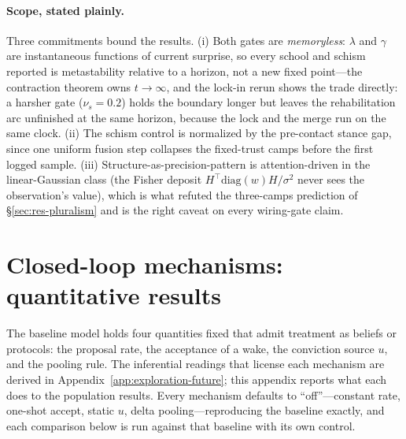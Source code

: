 \documentclass[runningheads]{llncs}
\begin{document}
\paragraph{Scope, stated plainly.}
Three commitments bound the results. (i) Both gates are \emph{memoryless}: $\lambda$ and
$\gamma$ are instantaneous functions of current surprise, so every school and schism reported is
metastability relative to a horizon, not a new fixed point---the contraction theorem owns
$t\to\infty$, and the lock-in rerun shows the trade directly: a harsher gate ($\nu_s{=}0.2$)
holds the boundary longer but leaves the rehabilitation arc unfinished at the same horizon,
because the lock and the merge run on the same clock. (ii) The schism control is normalized by
the pre-contact stance gap, since one uniform fusion step collapses the fixed-trust camps before
the first logged sample. (iii) Structure-as-precision-pattern is attention-driven in the
linear-Gaussian class (the Fisher deposit $H^{\!\top}\mathrm{diag}(w)H/\sigma^2$ never sees the
observation's value), which is what refuted the three-camps prediction of
\S\ref{sec:res-pluralism} and is the right caveat on every wiring-gate claim.



\section{Closed-loop mechanisms: quantitative results}
\label{app:closing}

The baseline model holds four quantities fixed that admit treatment as beliefs or protocols: the
proposal rate, the acceptance of a wake, the conviction source $u$, and the pooling rule. The
inferential readings that license each mechanism are derived in
Appendix~\ref{app:exploration-future}; this appendix reports what each does to the population
results. Every mechanism defaults to ``off''---constant rate, one-shot accept, static $u$, delta
pooling---reproducing the baseline exactly, and each comparison below is run against that
baseline with its own control.
\end{document}
